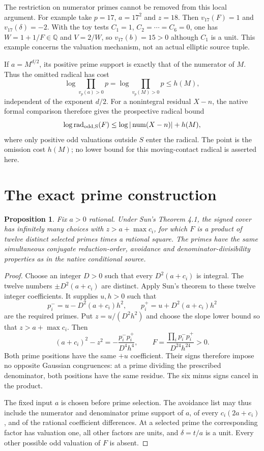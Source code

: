 \documentclass[11pt,a4paper]{article}
\newtheorem{proposition}[theorem]{Proposition}
\newcommand{\Q}{\mathbb Q}\newcommand{\Z}{\mathbb Z}
\begin{document}
The restriction on numerator primes cannot be removed from this
local argument. For example take $p=17$, $a=17^2$ and $z=18$.
Then $v_{17}(F)=1$ and $v_{17}(\delta)=-2$. With the toy tests
$C_1=1$, $C_2=\cdots=C_6=0$, one has $W=1+1/F\in\Q$ and
$V=2/W$, so $v_{17}(b)=15>0$ although $C_1$ is a unit.
This example concerns the valuation mechanism, not an actual
elliptic source tuple.

If $a=M^{d/2}$, its positive prime support is exactly that of the
numerator of $M$. Thus the omitted radical has cost
\[
 \log\prod_{v_p(a)>0}p
 =\log\prod_{v_p(M)>0}p\le h(M),
\]
independent of the exponent $d/2$. For a nonintegral residual
$X-n$, the native formal comparison therefore gives the prospective
radical bound
\[
 \log\operatorname{rad}_{\rm odd,S}(F)
 \le\log|\operatorname{num}(X-n)|+h(M),
\]
where only positive odd valuations outside $S$ enter the radical.
The point is the omission cost $h(M)$; no lower bound for this
moving-contact radical is asserted here.

\section{The exact prime construction}

\begin{proposition}\label{prop:prime}
Fix $a>0$ rational. Under Sun's Theorem 4.1, the signed cover has
infinitely many choices with $z>a+\max c_i$, for which $F$ is a
product of twelve distinct selected primes times a rational square.
The primes have the same simultaneous conjugate reduction-order,
avoidance and denominator-divisibility properties as in the native
conditional source.
\end{proposition}
\begin{proof}
Choose an integer $D>0$ such that every $D^2(a+c_i)$ is integral.
The twelve numbers $\pm D^2(a+c_i)$ are distinct. Apply Sun's
theorem to these twelve integer coefficients. It supplies $u,h>0$
such that
\[
 p_i^- =u-D^2(a+c_i)h^2,\qquad
 p_i^+ =u+D^2(a+c_i)h^2
\]
are the required primes. Put $z=u/(D^2h^2)$ and choose the slope
lower bound so that $z>a+\max c_i$. Then
\[
 (a+c_i)^2-z^2=-\frac{p_i^-p_i^+}{D^4h^4},\qquad
 F=\frac{\prod_i p_i^-p_i^+}{D^{24}h^{24}}>0.
\]
Both prime positions have the same $+u$ coefficient. Their signs
therefore impose no opposite Gaussian congruences: at a prime
dividing the prescribed denominator, both positions have the same
residue. The six minus signs cancel in the product.

The fixed input $a$ is chosen before prime selection. The avoidance
list may thus include the numerator and denominator prime support
of $a$, of every $c_i(2a+c_i)$, and of the rational coefficient
differences. At a selected prime the corresponding factor has
valuation one, all other factors are units, and $\delta=t/a$ is
a unit. Every other possible odd valuation of $F$ is absent.
\end{proof}
\end{document}
